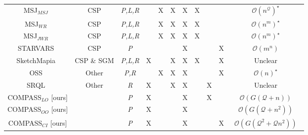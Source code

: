 {{\begin{table*}[t]
\begin{center}
\begin{tabular}{|c|cc|cccc|ccc|c|}
            MSJ$_{MSJ}$~\cite{Papadias1998}                     & CSP         & \textit{P,L,R} &   & X & X & X & X &   &   & $\mathcal{O}(n^\mathcal{Q})^{\star}$ \\ %
            MSJ$_{WR}$~\cite{Papadias1998}                      & CSP         & \textit{P,L,R} &   & X & X & X & X &   &   & $\mathcal{O}(n^m)^{\star}$ \\ %
            MSJ$_{JWR}$~\cite{Papadias1998}                     & CSP         & \textit{P,L,R} &   & X & X & X & X &   &   & $\mathcal{O}(n^m)^{\star}$ \\ %
            STARVARS~\cite{Lee2013}                             & CSP         & \textit{P}     &   &   &   & X &   &   & X & $\mathcal{O}(m^n)$ \\
            SketchMapia~\cite{Schwering2014,Jan2015}            & CSP \& SGM  & \textit{P,L,R} & X &   & X & X & X &   & X & Unclear \\         %
            OSS~\cite{Liu2003}                                  & Other       & \textit{P,R}   &   & X & X & X &   &   & X & $\mathcal{O}(n)^{\star}$ \\ %
            SRQL~\cite{Dellapenna2012,Dellapenna2017}           & Other       & \textit{R}     & X &   & X & X &   & X &   & Unclear \\
            COMPASS$_{LO}$ [ours]                               &             & \textit{P}     & X &   &   & X &   & X &   & $\mathcal{O}(G(\mathcal{Q} + n))$ \\    
            COMPASS$_{OO}$ [ours]                               &             & \textit{P}     & X &   &   & X &   &   &   & $\mathcal{O}(G(\mathcal{Q} + n^2))$ \\  
            COMPASS$_{CI}$ [ours]                               &             & \textit{P}     & X &   &   & X &   &   & X & ~$\mathcal{O}(G(\mathcal{Q}^2 + \mathcal{Q} n^2))$~ \\
            
            
            

\end{tabular}
\end{center}
\end{table*}}}
